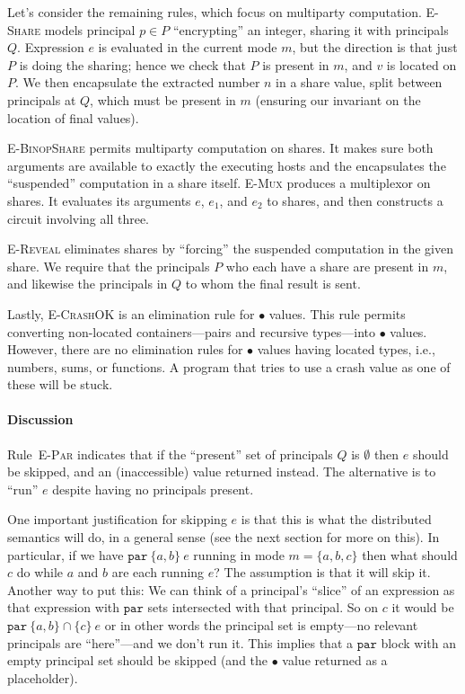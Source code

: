\documentclass[10pt]{article}
\newcommand{\rulelab}[1]{{\small \textsc{#1}}}
\newcommand{\kw}[1]{\ensuremath{\mathtt{#1}}}
\newcommand{\epar}[2]{\ensuremath{\kw{par}~{#1}~{#2}}}
\newcommand{\vcrash}{\ensuremath{\bullet}}
\begin{document}
Let's consider the remaining rules, which focus on multiparty
computation. \rulelab{E-Share} models principal $p \in P$
``encrypting'' an integer, sharing it with principals $Q$. Expression
$e$ is evaluated in the current mode $m$, but the direction is that
just $P$ is doing the sharing; hence we check that $P$ is present in
$m$, and $v$ is located
on $P$. We then encapsulate the extracted number $n$ in a share value,
split between principals at $Q$, which must be present in $m$
(ensuring our invariant on the location of final values).

\rulelab{E-BinopShare} permits multiparty computation on shares. It
makes sure both arguments are available to exactly the executing hosts
and the encapsulates the ``suspended'' computation in a share
itself. \rulelab{E-Mux} produces a multiplexor on shares. It evaluates
its arguments $e$, $e_1$, and $e_2$ to shares, and then constructs a
circuit involving all three.

\rulelab{E-Reveal} eliminates shares by ``forcing'' the suspended
computation in the given share. We require that the principals $P$ who
each have a share are present in $m$, and likewise the principals in
$Q$ to whom the final result is sent.

Lastly, \rulelab{E-CrashOK} is an elimination rule for $\vcrash$
values. This rule permits converting non-located containers---pairs
and recursive types---into $\vcrash$ values. However, there are no
elimination rules for $\vcrash$ values having located types, i.e.,
numbers, sums, or functions. A program that tries to use a crash value
as one of these will be stuck.

\paragraph{Discussion}

Rule~\rulelab{E-Par} indicates that if the ``present'' set of
principals $Q$ is $\emptyset$ then $e$ should be skipped, and an
(inaccessible) value returned instead. The alternative is to ``run''
$e$ despite having no principals present.

One important justification for skipping $e$ is that this is what the
distributed semantics will do, in a general sense (see the next
section for more on this). In particular, if
we have $\epar{\{a,b\}}{e}$ running in mode $m = \{ a, b, c \}$ then
what should $c$ do while $a$ and $b$ are each running $e$? The
assumption is that it will skip it. Another way to put this: We can
think of a principal's ``slice'' of an expression as that expression
with $\kw{par}$ sets intersected with that principal. So on $c$ it
would be $\epar{\{a,b\} \cap \{c\}}{e}$ or in other words the
principal set is empty---no relevant principals are ``here''---and we
don't run it. This implies that a $\kw{par}$ block with an empty
principal set should be skipped (and the $\vcrash$ value returned as a
placeholder). 
\end{document}
